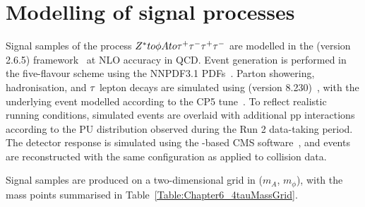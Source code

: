 
\section{Modelling of signal processes}
\label{Section:Chapter6_SignalModelling}

Signal samples of the process $Z^* to \phi A to \tau^+\tau^-\tau^+\tau^-$ are modelled in the \MCATNLO (version 2.6.5) framework~\cite{MadGraph,FxFx} at \ac{NLO} accuracy in \ac{QCD}. Event generation is performed in the five-flavour scheme using the NNPDF3.1 PDFs~\cite{NNPDF}. Parton showering, hadronisation, and $\tau$ lepton decays are simulated using \PYTHIA (version 8.230)~\cite{PYTHIA}, with the underlying event modelled according to the CP5 tune~\cite{CP5_Tune}. To reflect realistic running conditions, simulated events are overlaid with additional pp interactions according to the \ac{PU} distribution observed during the Run 2 data-taking period. The detector response is simulated using the \GEANTfour-based \ac{CMS} software~\cite{GEANT4}, and events are reconstructed with the same configuration as applied to collision data.

Signal samples are produced on a two-dimensional grid in ($m_A$, $m_\phi$), with the mass points summarised in Table~\ref{Table:Chapter6_4tauMassGrid}.

